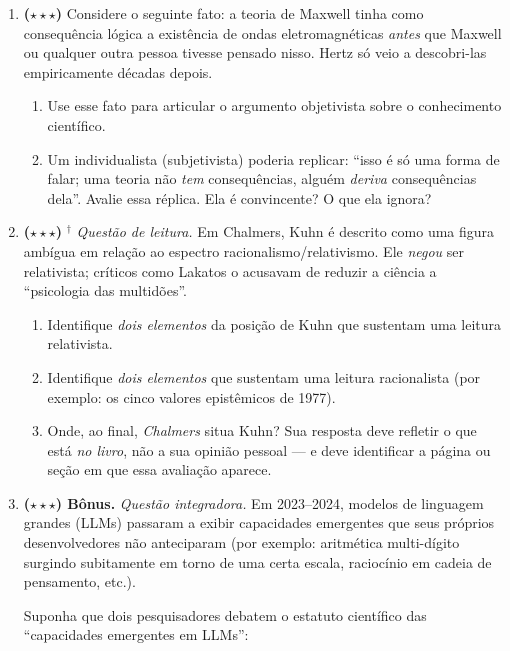 \documentclass[10pt,a4paper]{extarticle}
\newcommand{\impt}[1]{\textcolor{important}{#1}}
\newcommand{\livro}{\textcolor{notice}{$^{\dagger}$}}
\newcommand{\difiii}{$\star\star\star$}
\begin{document}
\begin{enumerate}[label=\textbf{\arabic*.}, leftmargin=*, start=17]
\item \textbf{(\difiii)} Considere o seguinte fato: a teoria de Maxwell tinha como consequência lógica a existência de ondas eletromagnéticas \emph{antes} que Maxwell ou qualquer outra pessoa tivesse pensado nisso. Hertz só veio a descobri-las empiricamente décadas depois.

\begin{enumerate}[label=(\alph*)]
    \item Use esse fato para articular o argumento \impt{objetivista} sobre o conhecimento científico.
    \item Um individualista (subjetivista) poderia replicar: ``isso é só uma forma de falar; uma teoria não \emph{tem} consequências, alguém \emph{deriva} consequências dela''. Avalie essa réplica. Ela é convincente? O que ela ignora?
\end{enumerate}

\item \textbf{(\difiii)} \livro{} \emph{Questão de leitura.} Em Chalmers, Kuhn é descrito como uma figura ambígua em relação ao espectro racionalismo/relativismo. Ele \emph{negou} ser relativista; críticos como Lakatos o acusavam de reduzir a ciência a ``psicologia das multidões''.

\begin{enumerate}[label=(\alph*)]
    \item Identifique \emph{dois elementos} da posição de Kuhn que sustentam uma leitura relativista.
    \item Identifique \emph{dois elementos} que sustentam uma leitura racionalista (por exemplo: os cinco valores epistêmicos de 1977).
    \item Onde, ao final, \emph{Chalmers} situa Kuhn? Sua resposta deve refletir o que está \emph{no livro}, não a sua opinião pessoal --- e deve identificar a página ou seção em que essa avaliação aparece.
\end{enumerate}

\item \textbf{(\difiii) Bônus.} \emph{Questão integradora.} Em 2023--2024, modelos de linguagem grandes (LLMs) passaram a exibir capacidades emergentes que seus próprios desenvolvedores não anteciparam (por exemplo: aritmética multi-dígito surgindo subitamente em torno de uma certa escala, raciocínio em cadeia de pensamento, etc.).

Suponha que dois pesquisadores debatem o estatuto científico das ``capacidades emergentes em LLMs'':


\end{enumerate}
\end{document}

